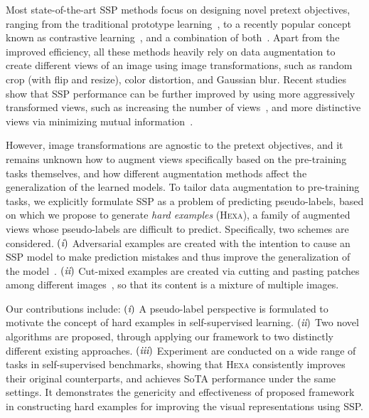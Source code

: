 \documentclass[10pt,twocolumn,letterpaper]{article}
\newcommand{\RN}[1]{\textup{\lowercase\expandafter{\it \romannumeral#1}}}
\newcommand{\shortname}{\textsc{Hexa}}
\begin{document}
Most state-of-the-art SSP methods focus on designing novel pretext objectives, ranging from the traditional prototype learning~\cite{xie2016unsupervised,yang2016joint,caron2018deepcluster,ji2019invariant,zhan2020online}, to a recently popular concept known as contrastive learning~\cite{chen2020simple,he2020momentum,chen2020improved,grill2020bootstrap}, and a combination of both~\cite{caron2020unsupervised,li2020prototypical}. Apart from the improved efficiency, all these methods heavily rely on data augmentation to create different views of an image using image transformations, such as random crop (with flip and resize), color distortion, and Gaussian blur. Recent studies show that SSP performance can be further improved by using more aggressively transformed views, such as increasing the number of views~\cite{caron2020unsupervised}, and more distinctive views via minimizing mutual information~\cite{tian2020makes}.

However, image transformations are agnostic to the pretext objectives, and it remains unknown how to augment views specifically based on the pre-training tasks themselves, 
and how different augmentation methods affect the generalization of the learned models.
To tailor data augmentation to pre-training tasks,
we explicitly formulate SSP as a problem of predicting pseudo-labels, based on which we propose to generate {\em hard examples} (\shortname{}), 
a family of augmented views whose pseudo-labels are difficult to predict. 
Specifically, two schemes are considered. 
$(\RN{1})$ Adversarial examples are created with the intention to cause an SSP model to make prediction mistakes and thus improve the generalization of the model~\cite{xie2020adversarial}.
$(\RN{2})$ Cut-mixed examples are created via cutting and pasting patches among different images~\cite{yun2019cutmix}, so that its content is a mixture of multiple images.

Our contributions include:
$(\RN{1})$ A pseudo-label perspective is formulated to motivate the concept of hard examples in self-supervised learning.
$(\RN{2})$ Two novel algorithms are proposed, through applying our framework to two distinctly different existing approaches.
$(\RN{3})$ Experiment are conducted on a wide range of tasks in self-supervised benchmarks, showing that  \shortname{}  consistently improves their original counterparts, and achieves SoTA performance under the same settings. It demonstrates the genericity and effectiveness of proposed framework in constructing hard examples for improving the visual representations using SSP.
\end{document}
